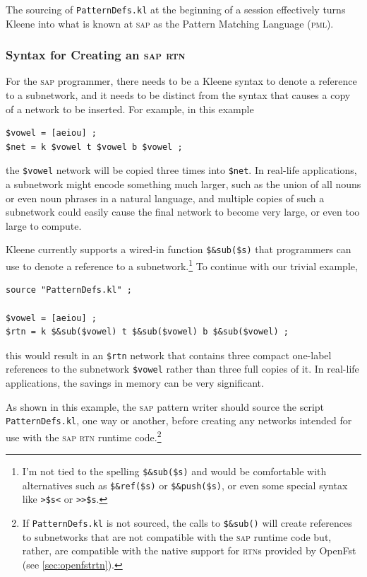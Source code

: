 \documentclass[letterpaper,12pt]{article}
\newcommand{\Kleene}{Kleene\xspace}
\newcommand{\acro}{\textsc}
\begin{document}
The sourcing of \texttt{PatternDefs.kl} at the beginning of a session
effectively turns \Kleene{} into what is known at \acro{sap} as the Pattern
Matching Language (\acro{pml}).

\subsubsection{Syntax for Creating an \acro{sap} \acro{rtn}}

For the \acro{sap} programmer, there needs to be a Kleene syntax to denote a
reference to a subnetwork, and it needs to be distinct from the syntax
that causes a copy of a network to be inserted.  For example, in this
example

\begin{Verbatim}[fontsize=\small]
$vowel = [aeiou] ;
$net = k $vowel t $vowel b $vowel ;
\end{Verbatim}

\noindent
the \verb!$vowel! network will be copied three times into \verb!$net!.  In
real-life applications, a subnetwork might encode something much larger, such
as the union of all nouns or even noun phrases in a natural language, and
multiple copies of such a subnetwork could easily
cause the final network to become very large, or even too large to
compute.

Kleene currently supports a wired-in function \verb!$&sub($s)! that
programmers can use to denote a reference to a subnetwork.\footnote{I'm
not tied to the spelling \verb!$&sub($s)! and would be comfortable with
alternatives such as \verb!$&ref($s)! or \verb!$&push($s)!, or even some
special syntax like \verb!>$s<! or \verb!>>$s!.}  To continue with our
trivial example, 

\begin{Verbatim}[fontsize=\small]
source "PatternDefs.kl" ;

$vowel = [aeiou] ;
$rtn = k $&sub($vowel) t $&sub($vowel) b $&sub($vowel) ;
\end{Verbatim}

\noindent
this would result in an \verb!$rtn! network that contains three compact
one-label references to the subnetwork \verb!$vowel! rather than three
full copies of it.  In real-life applications, the savings in memory can
be very significant.

As shown in this example, the \acro{sap} pattern writer should source the
script \verb!PatternDefs.kl!, one way or another, before creating any
networks intended for use with the \acro{sap} \acro{rtn} runtime
code.\footnote{If \verb!PatternDefs.kl! is not sourced, the calls to
\verb!$&sub()! will create references to subnetworks that are not
compatible with the \acro{sap} runtime code but, rather, are compatible
with the native support for \acro{rtn}s provided by OpenFst (see
\ref{sec:openfstrtn}).}
\end{document}
